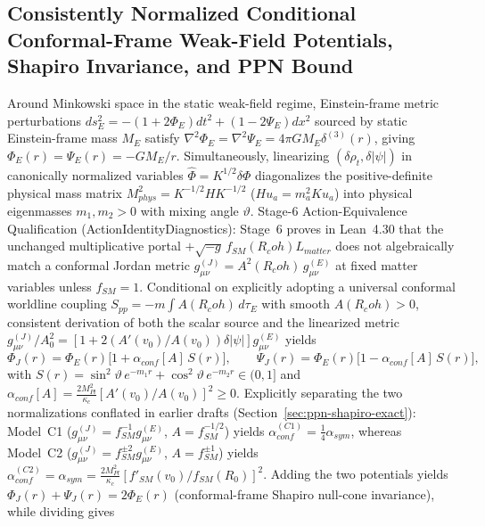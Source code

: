 \documentclass[american,11pt,letterpaper]{article}
\newcommand{\Rcoh}{R_{\mathrm{coh}}}
\def\mathbf#1{#1}%
\def\mathcal#1{#1}%
\def\mathrm#1{#1}%
\def\texttt#1{#1}%
\def\emph#1{#1}%
\def\Rcoh{R_coh}%
\begin{document}
\subsection{Consistently Normalized Conditional Conformal-Frame Weak-Field Potentials, Shapiro Invariance, and PPN Bound}
\label{app:ppn-derivation}

Around Minkowski space in the static weak-field regime, Einstein-frame metric perturbations $ds_E^2 = -(1 + 2\Phi_E)dt^2 + (1 - 2\Psi_E)d\mathbf{x}^2$ sourced by static Einstein-frame mass $M_E$ satisfy $\nabla^2\Phi_E = \nabla^2\Psi_E = 4\pi G M_E \delta^{(3)}(\mathbf{r})$, giving $\Phi_E(r) = \Psi_E(r) = -G M_E / r$. Simultaneously, linearizing $(\delta\rho_t, \delta|\psi|)$ in canonically normalized variables $\hat{\Phi} = K^{1/2}\delta\Phi$ diagonalizes the positive-definite physical mass matrix $M_{\mathrm{phys}}^2 = K^{-1/2} H K^{-1/2}$ ($H u_a = m_a^2 K u_a$) into physical eigenmasses $m_1, m_2 > 0$ with mixing angle $\vartheta$. \emph{Stage-6 Action-Equivalence Qualification (\texttt{ActionIdentityDiagnostics}):} Stage~6 proves in Lean~4.30 that the unchanged multiplicative portal $+\sqrt{-g}\,f_{\mathrm{SM}}(\Rcoh)\mathcal{L}_{\mathrm{matter}}$ does \emph{not} algebraically match a conformal Jordan metric $g_{\mu\nu}^{(J)} = A^2(\Rcoh)\,g_{\mu\nu}^{(E)}$ at fixed matter variables unless $f_{\mathrm{SM}} = 1$. Conditional on explicitly adopting a universal conformal worldline coupling $S_{\mathrm{pp}} = -m\int A(\Rcoh)\,d\tau_E$ with smooth $A(\Rcoh) > 0$, consistent derivation of both the scalar source and the linearized metric $g_{\mu\nu}^{(J)}/A_0^2 = [1 + 2(A'(v_0)/A(v_0))\delta|\psi|]g_{\mu\nu}^{(E)}$ yields
\begin{equation}
\Phi_J(r) = \Phi_E(r)\bigl[1 + \alpha_{\mathrm{conf}}[A]\,S(r)\bigr],
\qquad
\Psi_J(r) = \Phi_E(r)\bigl[1 - \alpha_{\mathrm{conf}}[A]\,S(r)\bigr],
\label{eq:appD_jordan_potentials}
\end{equation}
with $S(r) = \sin^2\vartheta\,e^{-m_1 r} + \cos^2\vartheta\,e^{-m_2 r} \in (0, 1]$ and $\alpha_{\mathrm{conf}}[A] = \frac{2 M_{\mathrm{Pl}}^2}{\kappa_c}[A'(v_0)/A(v_0)]^2 \ge 0$. Explicitly separating the two normalizations conflated in earlier drafts (Section~\ref{sec:ppn-shapiro-exact}): Model~C1 ($g_{\mu\nu}^{(J)} = f_{\mathrm{SM}}^{-1}g_{\mu\nu}^{(E)}$, $A = f_{\mathrm{SM}}^{-1/2}$) yields $\alpha_{\mathrm{conf}}^{(\mathrm{C1})} = \frac{1}{4}\alpha_{\mathrm{sym}}$, whereas Model~C2 ($g_{\mu\nu}^{(J)} = f_{\mathrm{SM}}^{\pm 2}g_{\mu\nu}^{(E)}$, $A = f_{\mathrm{SM}}^{\pm 1}$) yields $\alpha_{\mathrm{conf}}^{(\mathrm{C2})} = \alpha_{\mathrm{sym}} = \frac{2 M_{\mathrm{Pl}}^2}{\kappa_c}[f'_{\mathrm{SM}}(v_0)/f_{\mathrm{SM}}(R_0)]^2$. Adding the two potentials yields $\Phi_J(r) + \Psi_J(r) = 2\Phi_E(r)$ (conformal-frame Shapiro null-cone invariance), while dividing gives
\end{document}
